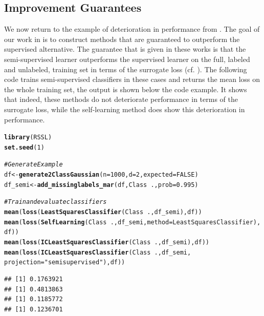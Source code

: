 \documentclass[runningheads,a4paper]{llncs}\usepackage[]{graphicx}\usepackage[]{color}
\makeatletter
\newcommand{\hlnum}[1]{\textcolor[rgb]{0.686,0.059,0.569}{#1}}%
\newcommand{\hlstr}[1]{\textcolor[rgb]{0.192,0.494,0.8}{#1}}%
\newcommand{\hlcom}[1]{\textcolor[rgb]{0.678,0.584,0.686}{\textit{#1}}}%
\newcommand{\hlopt}[1]{\textcolor[rgb]{0,0,0}{#1}}%
\newcommand{\hlstd}[1]{\textcolor[rgb]{0.345,0.345,0.345}{#1}}%
\newcommand{\hlkwb}[1]{\textcolor[rgb]{0.69,0.353,0.396}{#1}}%
\newcommand{\hlkwc}[1]{\textcolor[rgb]{0.333,0.667,0.333}{#1}}%
\newcommand{\hlkwd}[1]{\textcolor[rgb]{0.737,0.353,0.396}{\textbf{#1}}}%
\newenvironment{kframe}{%
 \def\at@end@of@kframe{}%
 \ifinner\ifhmode%
  \def\at@end@of@kframe{\end{minipage}}%
  \begin{minipage}{\columnwidth}%
 \fi\fi%
 \def\FrameCommand##1{\hskip\@totalleftmargin \hskip-\fboxsep
 \colorbox{shadecolor}{##1}\hskip-\fboxsep
     \hskip-\linewidth \hskip-\@totalleftmargin \hskip\columnwidth}%
 \MakeFramed {\advance\hsize-\width
   \@totalleftmargin\z@ \linewidth\hsize
   \@setminipage}}%
 {\par\unskip\endMakeFramed%
 \at@end@of@kframe}
\newenvironment{knitrout}{}{} %
\makeatother
\begin{document}
\subsection{Improvement Guarantees}
We now return to the example of deterioration in performance from . The goal of our work in \cite{Loog2016,Krijthe2016a,Krijthe2016} is to construct methods that are guaranteed to outperform the supervised alternative. The guarantee that is given in these works is that the semi-supervised learner outperforms the supervised learner on the full, labeled and unlabeled, training set in terms of the surrogate loss (cf. \cite{Loog2014b}). The following code trains semi-supervised classifiers in these cases and returns the mean loss on the whole training set, the output is shown below the code example. It shows that indeed, these methods do not deteriorate performance in terms of the surrogate loss, while the self-learning method does show this deterioration in performance.
\begin{knitrout}\footnotesize
{}\color{fgcolor}\begin{kframe}
\begin{alltt}
\hlkwd{library}\hlstd{(RSSL)}
\hlkwd{set.seed}\hlstd{(}\hlnum{1}\hlstd{)}

\hlcom{# Generate Example}
\hlstd{df} \hlkwb{<-} \hlkwd{generate2ClassGaussian}\hlstd{(}\hlkwc{n}\hlstd{=}\hlnum{1000}\hlstd{,} \hlkwc{d}\hlstd{=}\hlnum{2}\hlstd{,} \hlkwc{expected}\hlstd{=}\hlnum{FALSE}\hlstd{)}
\hlstd{df_semi} \hlkwb{<-} \hlkwd{add_missinglabels_mar}\hlstd{(df, Class}\hlopt{~}\hlstd{.,} \hlkwc{prob}\hlstd{=}\hlnum{0.995}\hlstd{)}

\hlcom{# Train and evaluate classifiers}
\hlkwd{mean}\hlstd{(}\hlkwd{loss}\hlstd{(}\hlkwd{LeastSquaresClassifier}\hlstd{(Class}\hlopt{~}\hlstd{.,df_semi),df))}
\hlkwd{mean}\hlstd{(}\hlkwd{loss}\hlstd{(}\hlkwd{SelfLearning}\hlstd{(Class}\hlopt{~}\hlstd{.,df_semi,}\hlkwc{method}\hlstd{=LeastSquaresClassifier),df))}
\hlkwd{mean}\hlstd{(}\hlkwd{loss}\hlstd{(}\hlkwd{ICLeastSquaresClassifier}\hlstd{(Class}\hlopt{~}\hlstd{.,df_semi),df))}
\hlkwd{mean}\hlstd{(}\hlkwd{loss}\hlstd{(}\hlkwd{ICLeastSquaresClassifier}\hlstd{(Class}\hlopt{~}\hlstd{.,df_semi,}
                          \hlkwc{projection}\hlstd{=}\hlstr{"semisupervised"}\hlstd{),df))}
\end{alltt}
\begin{verbatim}
## [1] 0.1763921
## [1] 0.4813863
## [1] 0.1185772
## [1] 0.1236701
\end{verbatim}
\end{kframe}
\end{knitrout}
\end{document}
